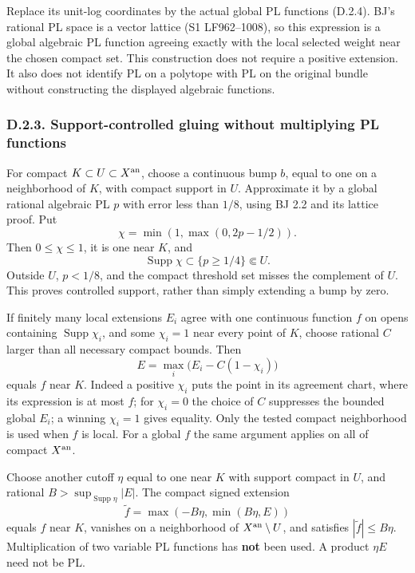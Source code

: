 \documentclass[
  10pt,
]{article}
\begin{document}
Replace its unit-log coordinates by the actual global PL functions
(D.2.4). BJ's rational PL space is a vector lattice (S1 LF962--1008), so
this expression is a global algebraic PL function agreeing exactly with
the local selected weight near the chosen compact set. This construction
does not require a positive extension. It also does not identify PL on a
polytope with PL on the original bundle without constructing the
displayed algebraic functions.

\subsubsection{D.2.3. Support-controlled gluing without multiplying PL
functions}\label{d.2.3.-support-controlled-gluing-without-multiplying-pl-functions}

For compact \(K\subset U\subset X^{\rm an}\), choose a continuous bump
\(b\), equal to one on a neighborhood of \(K\), with compact support in
\(U\). Approximate it by a global rational algebraic PL \(p\) with error
less than \(1/8\), using BJ 2.2 and its lattice proof. Put
\[\chi=\min(1,\max(0,2p-1/2)). \tag{D.2.5}\] Then \(0\le\chi\le1\), it
is one near \(K\), and
\[\operatorname{Supp}\chi\subset\{p\ge1/4\}\Subset U.\] Outside \(U\),
\(p<1/8\), and the compact threshold set misses the complement of \(U\).
This proves controlled support, rather than simply extending a bump by
zero.

If finitely many local extensions \(E_i\) agree with one continuous
function \(f\) on opens containing \(\operatorname{Supp}\chi_i\), and
some \(\chi_i=1\) near every point of \(K\), choose rational \(C\)
larger than all necessary compact bounds. Then
\[E=\max_i\bigl(E_i-C(1-\chi_i)\bigr) \tag{D.2.6}\] equals \(f\) near
\(K\). Indeed a positive \(\chi_i\) puts the point in its agreement
chart, where its expression is at most \(f\); for \(\chi_i=0\) the
choice of \(C\) suppresses the bounded global \(E_i\); a winning
\(\chi_i=1\) gives equality. Only the tested compact neighborhood is
used when \(f\) is local. For a global \(f\) the same argument applies
on all of compact \(X^{\rm an}\).

Choose another cutoff \(\eta\) equal to one near \(K\) with support
compact in \(U\), and rational \(B>\sup_{\operatorname{Supp}\eta}|E|\).
The compact signed extension
\[\widetilde f=\max(-B\eta,\min(B\eta,E)) \tag{D.2.7}\] equals \(f\)
near \(K\), vanishes on a neighborhood of \(X^{\rm an}\setminus U\), and
satisfies \(|\widetilde f|\le B\eta\). Multiplication of two variable PL
functions has \textbf{not} been used. A product \(\eta E\) need not be
PL.
\end{document}
